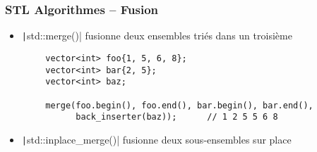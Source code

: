 \documentclass[C++.tex]{subfiles}
\begin{document}
\begin{frame}[fragile]
	\frametitle{STL Algorithmes -- Fusion}
	\begin{itemize}
		\item \texttt|std::merge()| fusionne deux ensembles triés dans un troisième
	\end{itemize}

	\begin{verbatim}
		vector<int> foo{1, 5, 6, 8};
		vector<int> bar{2, 5};
		vector<int> baz;

		merge(foo.begin(), foo.end(), bar.begin(), bar.end(),
		      back_inserter(baz));      // 1 2 5 5 6 8
	\end{verbatim}

	\begin{itemize}
		\item \texttt|std::inplace_merge()| fusionne deux sous-ensembles sur place
	\end{itemize}

\end{frame}
\end{document}
